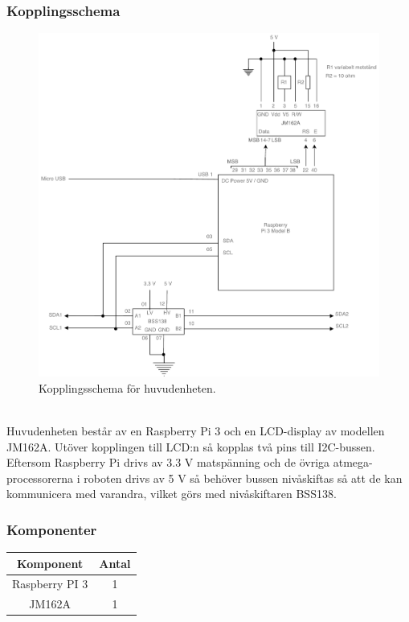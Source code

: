 \documentclass{article}
\begin{document}
\subsubsection{Kopplingsschema}

\begin{figure}[H]
\centering
\includegraphics[scale=0.45]{Huvudenhet_kopplingsschema}
\caption{Kopplingsschema för huvudenheten.}
\label{fig:huvudenhet_kopplingsschema}
\end{figure}
\ \\
Huvudenheten består av en Raspberry Pi 3 och en LCD-display av modellen JM162A. Utöver kopplingen till LCD:n så kopplas två pins till I2C-bussen. Eftersom Raspberry Pi drivs av 3.3 V matspänning och de övriga atmega-processorerna i roboten drivs av 5 V så behöver bussen nivåskiftas så att de kan kommunicera med varandra, vilket görs med nivåskiftaren BSS138.

\subsubsection{Komponenter}

\begin{table}[H]
   \centering
  \begin{tabular}{ | c | c | }
    \hline
    \textbf{Komponent} & \textbf{Antal} \\
    \hline
    Raspberry PI 3 & 1 \\
    \hline
    JM162A & 1 \\
    \hline
  \end{tabular}
\end{table}
\end{document}
